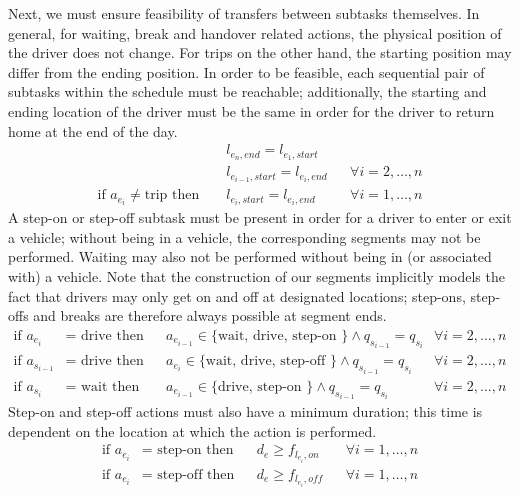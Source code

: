 \documentclass[]{article}
\begin{document}
Next, we must ensure feasibility of transfers between subtasks themselves. In general, for waiting, break and handover related actions, the physical position of the driver does not change. For trips on the other hand, the starting position may differ from the ending position. In order to be feasible, each sequential pair of subtasks within the schedule must be reachable; additionally, the starting and ending location of the driver must be the same in order for the driver to return home at the end of the day.
\begin{align}
  && l_{e_n,end} = l_{e_1,start} && \\
  && l_{e_{i-1},start} = l_{e_i,end} && \forall i = 2, \dots, n \\
  \text{if } a_{e_i} \neq \text{trip} \text{ then } && l_{e_i,start} = l_{e_i,end} && \forall i = 1, \dots, n
\end{align}
A step-on or step-off subtask must be present in order for a driver to enter or exit a vehicle; without being in a vehicle, the corresponding segments may not be performed. Waiting may also not be performed without being in (or associated with) a vehicle. Note that the construction of our segments implicitly models the fact that drivers may only get on and off at designated locations; step-ons, step-offs and breaks are therefore always possible at segment ends.
\begin{align}
  \text{if } a_{e_i} &= \text{ drive}\text{ then} &&a_{e_{i-1}} \in \text{\{ wait, drive, step-on \}} \land q_{s_{i-1}} = q_{s_{i}} && \forall i = 2, \dots, n \\
  \text{if } a_{s_{i-1}} &= \text{ drive}\text{ then} &&a_{e_{i}} \in \text{\{ wait, drive, step-off \}} \land q_{s_{i-1}} = q_{s_{i}} && \forall i = 2, \dots, n \\
  \text{if } a_{s_{i}} &= \text{ wait}\text{ then} &&a_{e_{i-1}} \in \text{\{ drive, step-on \}} \land q_{s_{i-1}} = q_{s_{i}} && \forall i = 2, \dots, n
\end{align}
Step-on and step-off actions must also have a minimum duration; this time is dependent on the location at which the action is performed.
\begin{align}
  \text{if } a_{e_i} &= \text{ step-on}\text{ then} && d_{e} \geq f_{l_{e_i},on} && \forall i = 1, \dots, n \\
  \text{if } a_{e_i} &= \text{ step-off}\text{ then} && d_{e} \geq f_{l_{e_i},\textit{off}} && \forall i = 1, \dots, n \\
\end{align}
\end{document}
